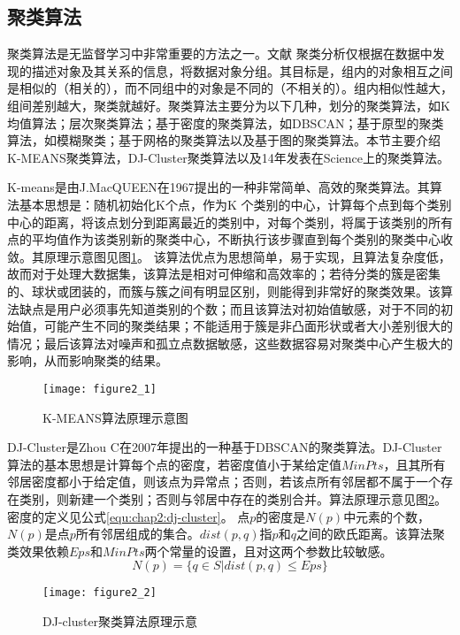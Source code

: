 \subsection{聚类算法}
聚类算法是无监督学习中非常重要的方法之一。文献\cite{pang2006introduction} 聚类分析仅根据在数据中发现的描述对象及其关系的信息，将数据对象分组。其目标是，组内的对象相互之间是相似的（相关的），而不同组中的对象是不同的（不相关的）。组内相似性越大，组间差别越大，聚类就越好。聚类算法主要分为以下几种，划分的聚类算法，如K均值算法；层次聚类算法；基于密度的聚类算法，如DBSCAN；基于原型的聚类算法，如模糊聚类；基于网格的聚类算法以及基于图的聚类算法。本节主要介绍K-MEANS聚类算法，DJ-Cluster聚类算法以及14年发表在Science上的聚类算法。
\par K-means是由J.MacQUEEN在1967提出的一种非常简单、高效的聚类算法。其算法基本思想是：随机初始化K个点，作为K 个类别的中心，计算每个点到每个类别中心的距离，将该点划分到距离最近的类别中，对每个类别，将属于该类别的所有点的平均值作为该类别新的聚类中心，不断执行该步骤直到每个类别的聚类中心收敛。其原理示意图见图\ref{fig:2_1}。 该算法优点为思想简单，易于实现，且算法复杂度低，故而对于处理大数据集，该算法是相对可伸缩和高效率的；若待分类的簇是密集的、球状或团装的，而簇与簇之间有明显区别，则能得到非常好的聚类效果。该算法缺点是用户必须事先知道类别的个数；而且该算法对初始值敏感，对于不同的初始值，可能产生不同的聚类结果；不能适用于簇是非凸面形状或者大小差别很大的情况；最后该算法对噪声和孤立点数据敏感，这些数据容易对聚类中心产生极大的影响，从而影响聚类的结果。
\begin{figure}[htp]
\centering
\texttt{[image: figure2\_1]}
\caption{K-MEANS算法原理示意图}
\label{fig:2_1}
\end{figure}
\par DJ-Cluster是Zhou C在2007年提出的一种基于DBSCAN的聚类算法。DJ-Cluster算法的基本思想是计算每个点的密度，若密度值小于某给定值$MinPts$，且其所有邻居密度都小于给定值，则该点为异常点；否则，若该点所有邻居都不属于一个存在类别，则新建一个类别；否则与邻居中存在的类别合并。算法原理示意见图\ref{fig:2_2}。密度的定义见公式\ref{equ:chap2:dj-cluster}。 点$p$的密度是$N(p)$中元素的个数，$N(p)$是点$p$所有邻居组成的集合。$dist(p,q)$指$p$和$q$之间的欧氏距离。该算法聚类效果依赖$Eps$和$MinPts$两个常量的设置，且对这两个参数比较敏感。
\begin{equation}
\label{equ:chap2:dj-cluster}
N(p)=\{q \in S|dist(p,q) \leq Eps\}
\end{equation}
\begin{figure}[htp]
\centering
\texttt{[image: figure2\_2]}
\caption{DJ-cluster聚类算法原理示意}
\label{fig:2_2}
\end{figure}
